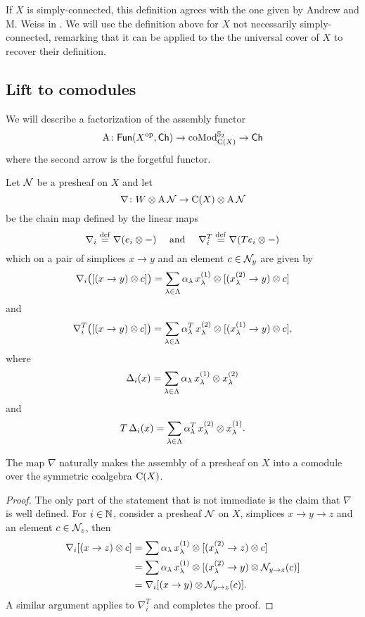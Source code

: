 If $X$ is simply-connected, this definition agrees with the one given by Andrew and M. Weiss in \cite[Definition 1.4]{ranicki1990assembly}.
We will use the definition above for $X$ not necessarily simply-connected, remarking that it can be applied to the the universal cover of $X$ to recover their definition.

\subsection{Lift to comodules}

We will describe a factorization of the assembly functor
\[
\operatorname{A} \colon \mathsf{Fun}(X^{\mathrm{op}}, \mathsf{Ch}) \to \operatorname{coMod}^{\mathbb{S}_2}_{\operatorname{C}(X)} \to \mathsf{Ch}
\]
where the second arrow is the forgetful functor.

Let $\mathcal{N}$ be a presheaf on $X$ and let
\[
\nabla \colon W \otimes \operatorname{A} \mathcal{N} \to \operatorname{C}(X) \otimes \operatorname{A} \mathcal{N}
\]
be the chain map defined by the linear maps
\[
\nabla_i \stackrel{\mathrm{def}}{=} \nabla(e_i \otimes -)
\quad \text{ and } \quad
\nabla_i^T \stackrel{\mathrm{def}}{=} \nabla(Te_i \otimes -)
\]
which on a pair of simplices $x \to y$ and an element $c \in \mathcal{N}_y$ are given by
\[
\nabla_i \big( [(x \to y) \otimes c] \big) =
\sum_{\lambda \in \Lambda} \alpha_\lambda \, x_\lambda^{(1)} \otimes [(x_\lambda^{(2)} \to y) \otimes c]
\]
and
\[
\nabla_i^T \big( [(x \to y) \otimes c] \big) =
\sum_{\lambda \in \Lambda} \alpha^T_\lambda \, x_\lambda^{(2)} \otimes [(x_\lambda^{(1)} \to y) \otimes c],
\]
where
\[
\operatorname{\Delta}_i(x) = \sum_{\lambda \in \Lambda} \alpha_\lambda \, x_\lambda^{(1)} \otimes x_\lambda^{(2)}
\]
and
\[
T \operatorname{\Delta}_i(x) =
\sum_{\lambda \in \Lambda} \alpha^T_\lambda \, x_\lambda^{(2)} \otimes x_\lambda^{(1)}.
\]

\begin{lemma*}
	The map $\nabla$ naturally makes the assembly of a presheaf on $X$ into a comodule over the symmetric coalgebra $\operatorname{C}(X)$.
\end{lemma*}

\begin{proof}
	The only part of the statement that is not immediate is the claim that $\nabla$ is well defined.
	For $i \in \mathbb{N}$, consider a presheaf $\mathcal{N}$ on $X$, simplices $x \to y \to z$ and an element $c \in \mathcal{N}_z$, then
	\begin{align*}
		\nabla_i [(x \to z) \otimes c] &=
		\sum \alpha_\lambda \, x^{(1)}_\lambda \otimes {[(x^{(2)}_\lambda \to z) \otimes c]} \\ &=
		\sum \alpha_\lambda \, x^{(1)}_\lambda \otimes [(x^{(2)}_\lambda \to y) \otimes \mathcal{N}_{y \to z}(c)] \\ &=
		\nabla_i [(x \to y) \otimes \mathcal{N}_{y \to z}(c)].
	\end{align*}
	A similar argument applies to $\nabla^T_i$ and completes the proof.
\end{proof}

